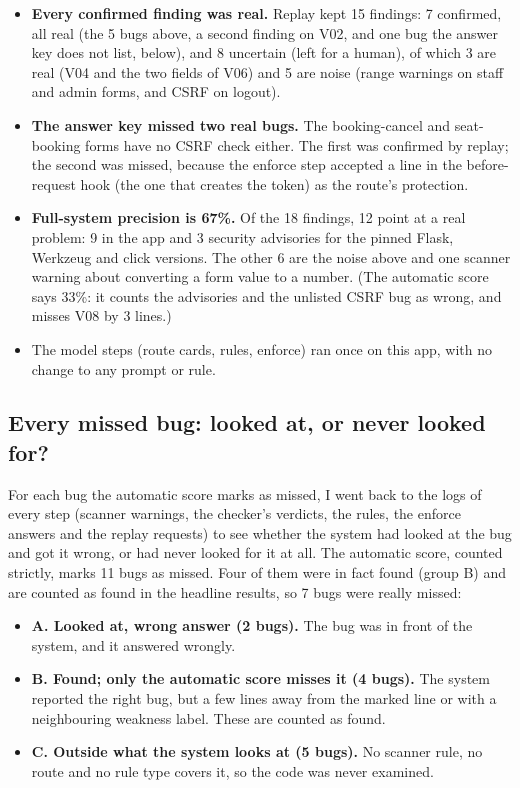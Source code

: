 \documentclass[11pt,a4paper]{article}
\begin{document}
\begin{itemize}
  \item \textbf{Every confirmed finding was real.} Replay kept 15 findings: 7 confirmed, all real (the 5 bugs above,
        a second finding on V02, and one bug the answer key does not list, below), and 8 uncertain
        (left for a human), of which 3 are real (V04 and the two fields of V06) and 5 are noise (range warnings on
        staff and admin forms, and CSRF on logout).
  \item \textbf{The answer key missed two real bugs.} The booking-cancel and seat-booking forms have no CSRF check
        either. The first was confirmed by replay; the second was missed, because the enforce step accepted a line
        in the before-request hook (the one that creates the token) as the route's protection.
  \item \textbf{Full-system precision is 67\%.} Of the 18 findings, 12 point at a real problem: 9 in the app
        and 3 security advisories for the pinned Flask, Werkzeug and click versions. The other 6 are the noise above
        and one scanner warning about converting a form value to a number. (The automatic score says 33\%: it
        counts the advisories and the unlisted CSRF bug as wrong, and misses V08 by 3 lines.)
  \item The model steps (route cards, rules, enforce) ran once on this app, with no change to any prompt or rule.
\end{itemize}

\subsection{Every missed bug: looked at, or never looked for?}
\label{sec:misses}

For each bug the automatic score marks as missed, I went back to the logs of every step (scanner warnings, the
checker's verdicts, the rules, the enforce answers and the replay requests) to see whether the system had looked at
the bug and got it wrong, or had never looked for it at all. The automatic score, counted strictly, marks 11 bugs as
missed. Four of them were in fact found (group B) and are counted as found in the headline results, so 7 bugs were
really missed:

\begin{itemize}[itemsep=3pt]
  \item \textbf{A. Looked at, wrong answer (2 bugs).} The bug was in front of the system, and it answered wrongly.
  \item \textbf{B. Found; only the automatic score misses it (4 bugs).} The system reported the right bug, but a
        few lines away from the marked line or with a neighbouring weakness label. These are counted as found.
  \item \textbf{C. Outside what the system looks at (5 bugs).} No scanner rule, no route and no rule type covers
        it, so the code was never examined.
\end{itemize}
\end{document}
